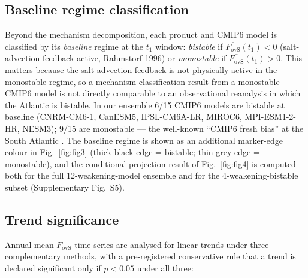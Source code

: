 \documentclass[12pt,a4paper]{article}
\newcommand{\Fovs}{F_\mathrm{ovS}}
\begin{document}
\subsection*{Baseline regime classification}

Beyond the mechanism decomposition, each product and CMIP6 model is
classified by its \emph{baseline} regime at the $t_1$ window:
\emph{bistable} if $\overline{\Fovs}(t_1) < 0$ (salt-advection
feedback active, Rahmstorf 1996) or \emph{monostable} if
$\overline{\Fovs}(t_1) > 0$. This matters because the salt-advection
feedback is not physically active in the monostable regime, so a
mechanism-classification result from a monostable CMIP6 model is not
directly comparable to an observational reanalysis in which the
Atlantic is bistable. In our ensemble 6/15 CMIP6 models are bistable
at baseline (CNRM-CM6-1, CanESM5, IPSL-CM6A-LR, MIROC6,
MPI-ESM1-2-HR, NESM3); 9/15 are monostable --- the well-known
``CMIP6 fresh bias'' at the South Atlantic
\citep{Mecking2017, Weijer2019, Portmann2026}. The baseline regime
is shown as an additional marker-edge colour in Fig.~\ref{fig:fig3}
(thick black edge = bistable; thin grey edge = monostable), and the
conditional-projection result of Fig.~\ref{fig:fig4} is computed
both for the full 12-weakening-model ensemble and for the
4-weakening-bistable subset (Supplementary Fig.~S5).

\subsection*{Trend significance}

Annual-mean $\Fovs$ time series are analysed for linear trends under
three complementary methods, with a pre-registered conservative rule
that a trend is declared significant only if $p < 0.05$ under all
three:
\end{document}
